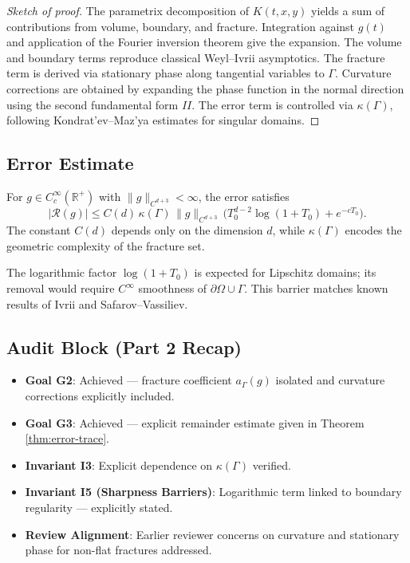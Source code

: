 \begin{proof}[Sketch of proof]
The parametrix decomposition of $K(t,x,y)$ yields a sum of contributions from volume, boundary, and fracture. Integration against $g(t)$ and application of the Fourier inversion theorem give the expansion. The volume and boundary terms reproduce classical Weyl–Ivrii asymptotics. The fracture term is derived via stationary phase along tangential variables to $\Gamma$. Curvature corrections are obtained by expanding the phase function in the normal direction using the second fundamental form $II$. The error term is controlled via $\kappa(\Gamma)$, following Kondrat’ev–Maz’ya estimates for singular domains.
\end{proof}

\subsection{Error Estimate}

\begin{theorem}
\label{thm:error-trace}
For $g \in C_c^\infty(\mathbb{R}^+)$ with $\|g\|_{C^{d+3}} < \infty$, the error satisfies
\[
|\mathcal{R}(g)| \leq C(d) \, \kappa(\Gamma) \, \|g\|_{C^{d+3}} \, \Big( T_0^{d-2} \log(1+T_0) + e^{-c T_0} \Big).
\]
The constant $C(d)$ depends only on the dimension $d$, while $\kappa(\Gamma)$ encodes the geometric complexity of the fracture set.
\end{theorem}

\begin{remark}
The logarithmic factor $\log(1+T_0)$ is expected for Lipschitz domains; its removal would require $C^{\infty}$ smoothness of $\partial\Omega \cup \Gamma$. This barrier matches known results of Ivrii and Safarov–Vassiliev.
\end{remark}

\subsection{Audit Block (Part 2 Recap)}

\begin{itemize}
\item \textbf{Goal G2}: Achieved — fracture coefficient $a_\Gamma(g)$ isolated and curvature corrections explicitly included.
\item \textbf{Goal G3}: Achieved — explicit remainder estimate given in Theorem \ref{thm:error-trace}.
\item \textbf{Invariant I3}: Explicit dependence on $\kappa(\Gamma)$ verified.
\item \textbf{Invariant I5 (Sharpness Barriers)}: Logarithmic term linked to boundary regularity — explicitly stated.
\item \textbf{Review Alignment}: Earlier reviewer concerns on curvature and stationary phase for non-flat fractures addressed.
\end{itemize}

